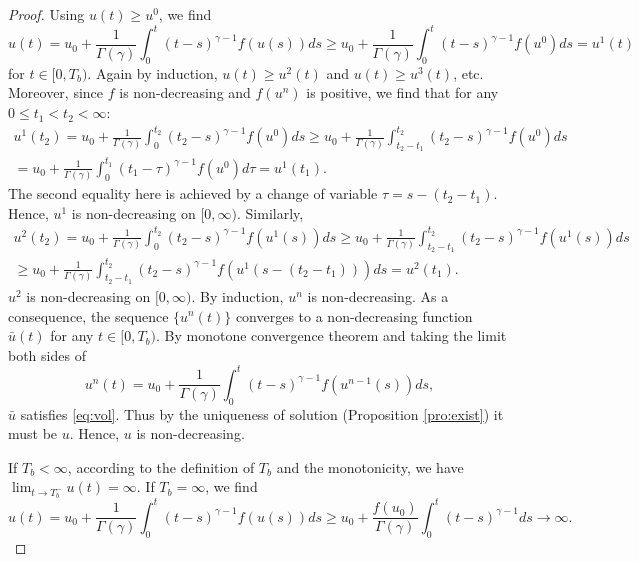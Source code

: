 \documentclass[12pt]{amsart}%
\theoremstyle{definition}
\theoremstyle{remark}
\renewcommand{\ge}{\geqslant}
\renewcommand{\le}{\leqslant}
\begin{document}
\begin{proof}
Using $u(t)\ge u^0$, we find 
\[
u(t)=u_0+\frac{1}{\Gamma(\gamma)}\int_0^t(t-s)^{\gamma-1}f(u(s))ds \ge u_0+\frac{1}{\Gamma(\gamma)}\int_0^t(t-s)^{\gamma-1}f(u^0) ds=u^1(t)
\]
 for $t\in [0, T_b)$. Again by induction, $u(t)\ge u^2(t)$ and $u(t)\ge u^3(t)$, etc. Moreover, since $f$ is non-decreasing and $f(u^n)$ is positive, we find that for any $0\le t_1<t_2<\infty$:
 \begin{multline*}
 u^1(t_2)=u_0+\frac{1}{\Gamma(\gamma)}\int_0^{t_2}(t_2-s)^{\gamma-1}f(u^0)ds
 \ge u_0+\frac{1}{\Gamma(\gamma)}\int_{t_2-t_1}^{t_2}(t_2-s)^{\gamma-1}f(u^0)ds\\
=u_0+\frac{1}{\Gamma(\gamma)}\int_{0}^{t_1}(t_1-\tau)^{\gamma-1}f(u^0)d\tau=u^1(t_1).
 \end{multline*}
 The second equality here is achieved by a change of variable $\tau=s-(t_2-t_1)$. 
 Hence, $u^1$ is non-decreasing on $[0,\infty)$. Similarly,
  \begin{multline*}
 u^2(t_2)=u_0+\frac{1}{\Gamma(\gamma)}\int_0^{t_2}(t_2-s)^{\gamma-1}f(u^1(s))ds
 \ge u_0+\frac{1}{\Gamma(\gamma)}\int_{t_2-t_1}^{t_2}(t_2-s)^{\gamma-1}f(u^1(s))ds \\
 \ge u_0+\frac{1}{\Gamma(\gamma)}\int_{t_2-t_1}^{t_2}(t_2-s)^{\gamma-1}f(u^1(s-(t_2-t_1)))ds
=u^2(t_1).
 \end{multline*}
 $u^2$ is non-decreasing on $[0, \infty)$. By induction, $u^n$ is non-decreasing. As a consequence, the sequence $\{u^n(t)\}$ converges to a non-decreasing function $\bar{u}(t)$ for any $t\in [0, T_b)$. By monotone convergence theorem and taking the limit both sides of \[
 u^n(t)=u_0+\frac{1}{\Gamma(\gamma)}\int_0^t(t-s)^{\gamma-1}f(u^{n-1}(s))ds,
 \]
$\bar{u}$ satisfies \eqref{eq:vol}. Thus by the uniqueness of solution (Proposition \ref{pro:exist}) it must be $u$. Hence, $u$ is  non-decreasing.


If $T_b<\infty$, according to the definition of $T_b$ and  the monotonicity, we have $\lim_{t\to T_b^-}u(t)=\infty$. If $T_b=\infty$,  we find
\[
u(t)=u_0+\frac{1}{\Gamma(\gamma)}\int_0^t(t-s)^{\gamma-1}f(u(s))ds
\ge u_0+\frac{f(u_0)}{\Gamma(\gamma)}\int_0^t(t-s)^{\gamma-1}ds\to\infty.
\]
\end{proof}
\end{document}
